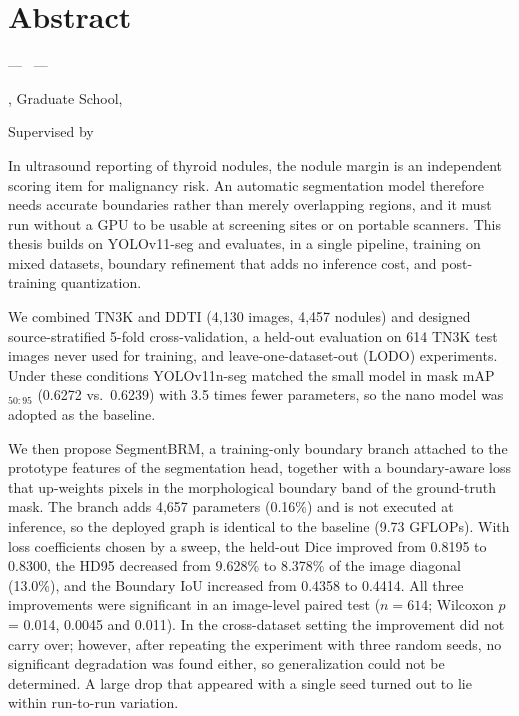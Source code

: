 \cleardoublepage
\chapter*{Abstract}

\begin{center}
{\large\bfseries \ThesisTitleEn\par}
{\normalsize --- \ThesisSubtitleEn\ ---\par}
\vspace{2mm}
{\normalsize \AuthorEn\par}
{\normalsize \DepartmentEn, Graduate School, \UniversityEn\par}
{\normalsize Supervised by \AdvisorEn\par}
\end{center}
\vspace{4mm}

In ultrasound reporting of thyroid nodules, the nodule margin is an independent scoring item for
malignancy risk. An automatic segmentation model therefore needs accurate boundaries rather than merely
overlapping regions, and it must run without a GPU to be usable at screening sites or on portable
scanners. This thesis builds on YOLOv11-seg and evaluates, in a single pipeline, training on mixed
datasets, boundary refinement that adds no inference cost, and post-training quantization.

We combined TN3K and DDTI (4,130 images, 4,457 nodules) and designed source-stratified 5-fold
cross-validation, a held-out evaluation on 614 TN3K test images never used for training, and
leave-one-dataset-out (LODO) experiments. Under these conditions YOLOv11n-seg matched the small model in
mask mAP$_{50:95}$ (0.6272 vs.\ 0.6239) with 3.5 times fewer parameters, so the nano model was adopted
as the baseline.

We then propose SegmentBRM, a training-only boundary branch attached to the prototype features of the
segmentation head, together with a boundary-aware loss that up-weights pixels in the morphological
boundary band of the ground-truth mask. The branch adds 4,657 parameters (0.16\%) and is not executed at
inference, so the deployed graph is identical to the baseline (9.73 GFLOPs). With loss coefficients chosen
by a sweep, the held-out Dice improved from 0.8195 to 0.8300, the HD95 decreased from 9.628\% to 8.378\% of
the image diagonal (13.0\%), and the Boundary IoU increased from 0.4358 to 0.4414. All three improvements
were significant in an image-level paired test ($n=614$; Wilcoxon $p$ = 0.014, 0.0045 and 0.011).
In the cross-dataset setting the improvement did not carry over; however, after repeating the experiment
with three random seeds, no significant degradation was found either, so generalization could not be
determined. A large drop that appeared with a single seed turned out to lie within run-to-run variation.

